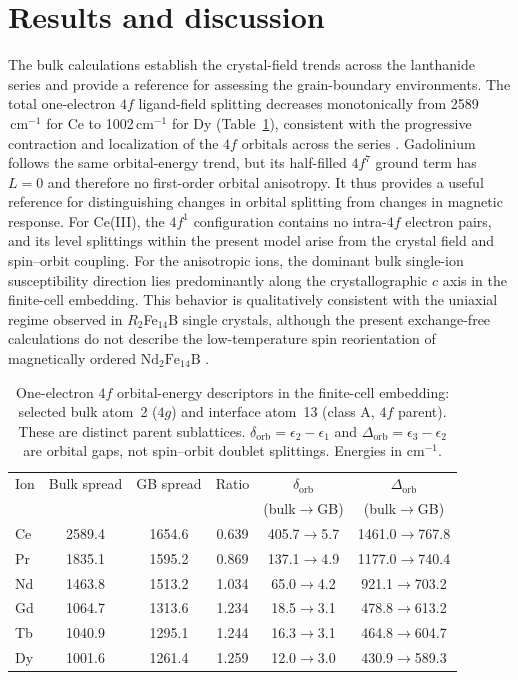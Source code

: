 \documentclass[final,1p,times]{elsarticle}
\DeclareRobustCommand{\rev}[1]{{\color{revcolor}#1}}
\newcommand{\ndfeb}{\mathrm{Nd_2Fe_{14}B}}
\newcommand{\invcm}{\ensuremath{\,\mathrm{cm}^{-1}}}
\begin{document}
\section{Results and discussion}
\rev{The bulk calculations establish the crystal-field trends across the lanthanide series and provide a reference for assessing the grain-boundary environments. The total one-electron $4f$ ligand-field splitting decreases monotonically from 2589\invcm{} for Ce to 1002\invcm{} for Dy (Table~\ref{tab:cf}), consistent with the progressive contraction and localization of the $4f$ orbitals across the series \cite{aravena2016,freeman1962}. Gadolinium follows the same orbital-energy trend, but its half-filled $4f^7$ ground term has $L=0$ and therefore no first-order orbital anisotropy. It thus provides a useful reference for distinguishing changes in orbital splitting from changes in magnetic response. For Ce(III), the $4f^1$ configuration contains no intra-$4f$ electron pairs, and its level splittings within the present model arise from the crystal field and spin--orbit coupling. For the anisotropic ions, the dominant bulk single-ion susceptibility direction lies predominantly along the crystallographic $c$ axis in the finite-cell embedding. This behavior is qualitatively consistent with the uniaxial regime observed in $R_2$Fe$_{14}$B single crystals, although the present exchange-free calculations do not describe the low-temperature spin reorientation of magnetically ordered $\ndfeb$ \cite{hirosawa1986,yamada1988}.}

\begin{table}[H]
\centering
\caption{\rev{One-electron $4f$ orbital-energy descriptors in the finite-cell embedding: selected bulk atom~2 ($4g$) and interface atom~13 (class A, $4f$ parent).} \rev{These are distinct parent sublattices.} \rev{$\delta_{\mathrm{orb}}=\epsilon_2-\epsilon_1$ and $\Delta_{\mathrm{orb}}=\epsilon_3-\epsilon_2$ are orbital gaps, not spin--orbit doublet splittings.} \rev{Energies in cm$^{-1}$.}}
\label{tab:cf}
\small
\begin{tabular}{lccccc}
\toprule
Ion & Bulk spread & GB spread & Ratio & $\delta_{\mathrm{orb}}$ & $\Delta_{\mathrm{orb}}$ \\
 & & & & (bulk$\to$GB) & (bulk$\to$GB) \\
\midrule
Ce & \rev{2589.4} & \rev{1654.6} & \rev{0.639} & \rev{405.7$\to$5.7} & \rev{1461.0$\to$767.8} \\
Pr & \rev{1835.1} & \rev{1595.2} & \rev{0.869} & \rev{137.1$\to$4.9} & \rev{1177.0$\to$740.4} \\
Nd & \rev{1463.8} & \rev{1513.2} & \rev{1.034} & \rev{65.0$\to$4.2} & \rev{921.1$\to$703.2} \\
Gd & \rev{1064.7} & \rev{1313.6} & \rev{1.234} & \rev{18.5$\to$3.1} & \rev{478.8$\to$613.2} \\
Tb & \rev{1040.9} & \rev{1295.1} & \rev{1.244} & \rev{16.3$\to$3.1} & \rev{464.8$\to$604.7} \\
Dy & \rev{1001.6} & \rev{1261.4} & \rev{1.259} & \rev{12.0$\to$3.0} & \rev{430.9$\to$589.3} \\
\bottomrule
\end{tabular}
\end{table}
\end{document}
